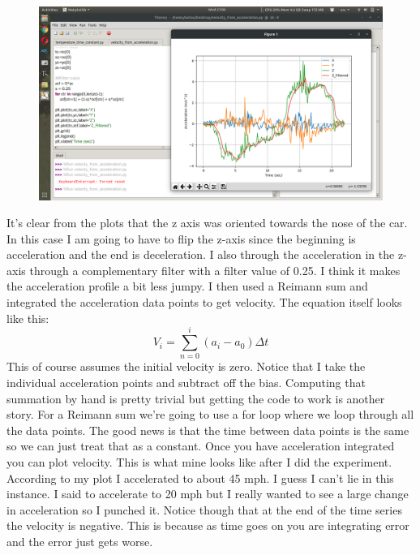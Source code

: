 \begin{figure}[H]
  \begin{center}
    \includegraphics[width=\textwidth]{Figures/accelerometer_plots.png}
  \end{center}
\end{figure}
It’s clear from the plots that the z axis was oriented towards the nose of the car. In this case I am going to have to flip the z-axis since the beginning is acceleration and the end is deceleration. I also through the acceleration in the z-axis through a complementary filter with a filter value of 0.25. I think it makes the acceleration profile a bit less jumpy. I then used a Reimann sum and integrated the acceleration data points to get velocity. The equation itself looks like this:
\begin{equation}
V_i = \sum\limits_{n=0}^{i}{(a_i-a_0)\Delta t}
\end{equation}
This of course assumes the initial velocity is zero. Notice that I take the individual acceleration points and subtract off the bias. Computing that summation by hand is pretty trivial but getting the code to work is another story. For a Reimann sum we’re going to use a for loop where we loop through all the data points. The good news is that the time between data points is the same so we can just treat that as a constant. Once you have acceleration integrated you can plot velocity. This is what mine looks like after I did the experiment. According to my plot I accelerated to about 45 mph. I guess I can’t lie in this instance. I said to accelerate to 20 mph but I really wanted to see a large change in acceleration so I punched it. Notice though that at the end of the time series the velocity is negative. This is because as time goes on you are integrating error and the error just gets worse.
